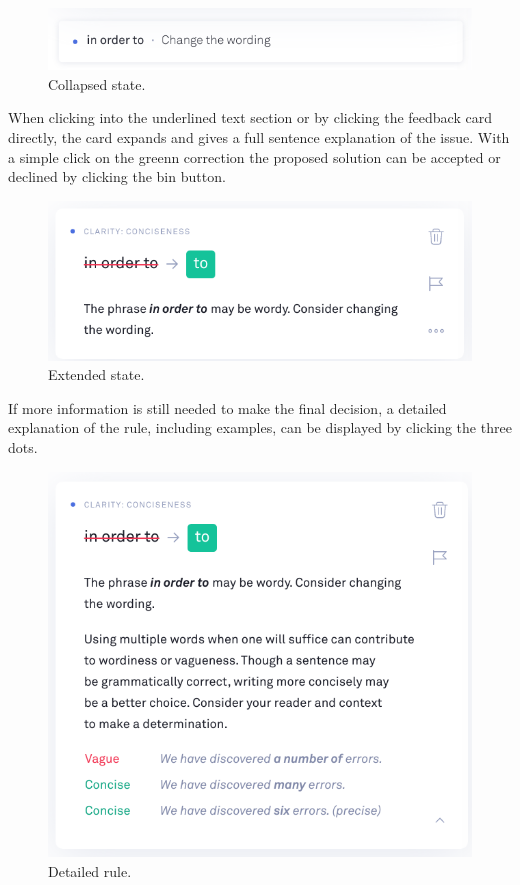 \documentclass[runningheads]{llncs}
\begin{document}
\begin{figure}[H]
  \includegraphics[width=\linewidth]{images/state_1.png}
  \caption{Collapsed state.}
  \label{fig:state1}
\end{figure}

When clicking into the underlined text section or by clicking the feedback card directly, the card expands and gives a full sentence explanation of the issue. With a simple click on the greenn correction the proposed solution can be accepted or declined by clicking the bin button.
\begin{figure}[H]
  \includegraphics[width=\linewidth]{images/state_2.png}
  \caption{Extended state.}
  \label{fig:state2}
\end{figure}

If more information is still needed to make the final decision, a detailed explanation of the rule, including examples, can be displayed by clicking the three dots. 
\begin{figure}[H]
  \includegraphics[width=\linewidth]{images/state_3.png}
  \caption{Detailed rule.}
  \label{fig:state3}
\end{figure}
\end{document}
